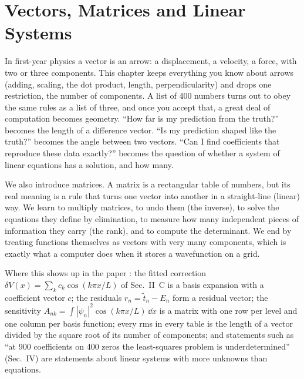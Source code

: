 \chapter{Vectors, Matrices and Linear Systems}\label{ch:linear-algebra}

\begin{chapterintro}
In first-year physics a vector is an arrow: a displacement, a velocity, a force, with two or three components. This chapter keeps everything you know about arrows (adding, scaling, the dot product, length, perpendicularity) and drops one restriction, the number of components. A list of 400 numbers turns out to obey the same rules as a list of three, and once you accept that, a great deal of computation becomes geometry. ``How far is my prediction from the truth?'' becomes the length of a difference vector. ``Is my prediction shaped like the truth?'' becomes the angle between two vectors. ``Can I find coefficients that reproduce these data exactly?'' becomes the question of whether a system of linear equations has a solution, and how many.

We also introduce matrices. A matrix is a rectangular table of numbers, but its real meaning is a rule that turns one vector into another in a straight-line (linear) way. We learn to multiply matrices, to undo them (the inverse), to solve the equations they define by elimination, to measure how many independent pieces of information they carry (the rank), and to compute the determinant. We end by treating functions themselves as vectors with very many components, which is exactly what a computer does when it stores a wavefunction on a grid.

Where this shows up in the paper \cite{soniR1}: the fitted correction $\delta V(x)=\sum_k c_k\cos(k\pi x/L)$ of Sec.~II~C is a basis expansion with a coefficient vector $c$; the residuals $r_n=\tilde t_n-E_n$ form a residual vector; the sensitivity $A_{nk}=\int|\psi_n|^2\cos(k\pi x/L)\,\dd x$ is a matrix with one row per level and one column per basis function; every rms in every table is the length of a vector divided by the square root of its number of components; and statements such as ``at 900 coefficients on 400 zeros the least-squares problem is underdetermined'' (Sec.~IV) are statements about linear systems with more unknowns than equations.
\end{chapterintro}


